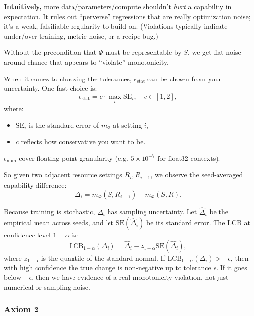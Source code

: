 \documentclass[12pt]{article}
\begin{document}
\textbf{Intuitively,} more data/parameters/compute shouldn’t \textit{hurt} a capability in expectation. It rules out “perverse” regressions that are really optimization noise; it’s a weak, falsifiable regularity to build on. (Violations typically indicate under/over-training, metric noise, or a recipe bug.)

Without the precondition that $\Phi$ must be representable by $S$, we get flat noise around chance that appears to “violate” monotonicity.

When it comes to choosing the tolerances, $\epsilon_\text{stat}$ can be chosen from your uncertainty. One fast choice is:
\[
\epsilon_\text{stat} = c\cdot \max _ i \text{SE} _i,\quad c\in [1,2],
\]
where:
\begin{itemize}
    \item $\text{SE}_i $ is the standard error of $m_\Phi$ at setting $i$,
    \item $c$ reflects how conservative you want to be.
\end{itemize}

$\epsilon_\text{num}$ cover floating-point granularity (e.g. $5\times 10^{-7}$ for float32 contexts).

So given two adjacent resource settings $R_i,R_{i+1}$, we observe the seed-averaged capability difference:
\[
\Delta_i = m_\Phi(S,R_{i+1})-m_\Phi(S,R).
\]

Because training is stochastic, $\Delta_i$ has sampling uncertainty. Let $\widehat \Delta_i$ be the empirical mean across seeds, and let $\text{SE}(\widehat \Delta_i)$ be its standard error. The LCB at confidence level $1-\alpha$ is:
\[
\text{LCB}_{1-\alpha}(\Delta_i)=\widehat \Delta_i - z_{1-\alpha} \text{SE}(\widehat \Delta_i),
\]
where $z_{1-\alpha}$ is the quantile of the standard normal. If $\text{LCB}_{1-\alpha}(\Delta_i)>-\epsilon$, then with high confidence the true change is non-negative up to tolerance $\epsilon$. If it goes below $-\epsilon$, then we have evidence of a real monotonicity violation, not just numerical or sampling noise.

\subsubsection{Axiom 2}
\end{document}
